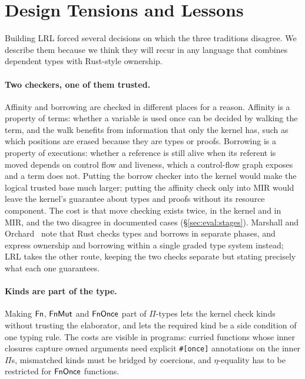 \section{Design Tensions and Lessons}\label{sec:tensions}

Building LRL forced several decisions on which the three traditions disagree.
We describe them because we think they will recur in any language that combines dependent types with Rust-style ownership.

\paragraph{Two checkers, one of them trusted.}
Affinity and borrowing are checked in different places for a reason.
Affinity is a property of terms: whether a variable is used once can be decided by walking the term, and the walk benefits from information that only the kernel has, such as which positions are erased because they are types or proofs.
Borrowing is a property of executions: whether a reference is still alive when its referent is moved depends on control flow and liveness, which a control-flow graph exposes and a term does not.
Putting the borrow checker into the kernel would make the logical trusted base much larger; putting the affinity check only into MIR would leave the kernel's guarantee about types and proofs without its resource component.
The cost is that move checking exists twice, in the kernel and in MIR, and the two disagree in documented cases (\S\ref{sec:eval:stages}).
Marshall and Orchard~\cite{marshall2024fractional} note that Rust checks types and borrows in separate phases, and express ownership and borrowing within a single graded type system instead; LRL takes the other route, keeping the two checks separate but stating precisely what each one guarantees.

\paragraph{Kinds are part of the type.}
Making $\mathsf{Fn}$, $\mathsf{FnMut}$ and $\mathsf{FnOnce}$ part of $\Pi$-types lets the kernel check kinds without trusting the elaborator, and lets the required kind be a side condition of one typing rule.
The costs are visible in programs: curried functions whose inner closures capture owned arguments need explicit \lstinline|#[once]| annotations on the inner $\Pi$s, mismatched kinds must be bridged by coercions, and $\eta$-equality has to be restricted for $\mathsf{FnOnce}$ functions.

